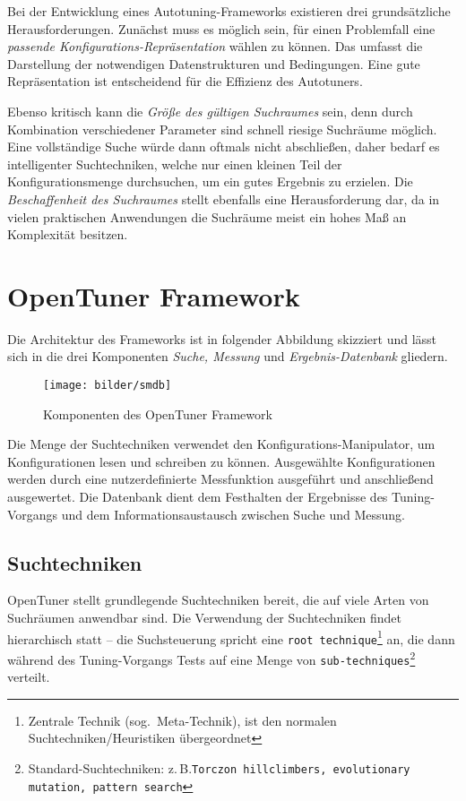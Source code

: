 \documentclass[a4paper,11pt]{scrartcl}
\newcommand{\zB}{\mbox{z.\,B.}\xspace}
\begin{document}
Bei der Entwicklung eines Autotuning-Frameworks existieren drei grundsätzliche Herausforderungen.
Zunächst muss es möglich sein, für einen Problemfall eine \emph{passende Konfigurations-Repräsentation} wählen
zu können. Das umfasst die Darstellung der notwendigen Datenstrukturen und Bedingungen. Eine gute 
Repräsentation ist entscheidend für die Effizienz des Autotuners. \newline 

Ebenso kritisch kann die \emph{Größe des gültigen Suchraumes} sein, denn durch Kombination 
verschiedener Parameter sind schnell riesige Suchräume möglich. Eine vollständige Suche würde 
dann oftmals nicht abschließen,
daher bedarf es intelligenter Suchtechniken, welche nur einen kleinen Teil der Konfigurationsmenge
durchsuchen, um ein gutes Ergebnis zu erzielen. Die \emph{Beschaffenheit des Suchraumes} stellt
ebenfalls eine Herausforderung dar, da in vielen praktischen Anwendungen die Suchräume meist ein
hohes Maß an Komplexität besitzen.

\newpage



\section{OpenTuner Framework}
Die Architektur des Frameworks ist in folgender Abbildung skizziert und lässt sich in die drei 
Komponenten \emph{Suche, Messung} und \emph{Ergebnis-Datenbank} gliedern.

\begin{figure}[h]
\begin{center}
\texttt{[image: bilder/smdb]}
\cite[S.~3]{OT-paper} \caption{Komponenten des OpenTuner Framework} 
\end{center}   
\end{figure}
\vspace{-.25cm} %

Die Menge der Suchtechniken verwendet den Konfigurations-Manipulator, um Konfigurationen lesen und 
schreiben zu können. Ausgewählte Konfigurationen werden durch eine nutzerdefinierte Messfunktion
ausgeführt und anschließend ausgewertet. Die Datenbank dient dem Festhalten der Ergebnisse des Tuning-Vorgangs
und dem Informationsaustausch zwischen Suche und Messung.


\subsection{Suchtechniken}
OpenTuner stellt grundlegende Suchtechniken bereit, die auf viele Arten von 
Suchräumen anwendbar sind. Die Verwendung der Suchtechniken findet hierarchisch statt --
die Suchsteuerung spricht eine \texttt{root technique}\footnote{Zentrale Technik (sog.~Meta-Technik),
ist den normalen Suchtechniken/Heuristiken übergeordnet} an, die dann während des Tuning-Vorgangs 
Tests auf eine Menge von \texttt{sub-techniques}\footnote{Standard-Suchtechniken:
\zB \texttt{Torczon hillclimbers, evolutionary mutation, pattern search}} verteilt.  \newline
\end{document}
